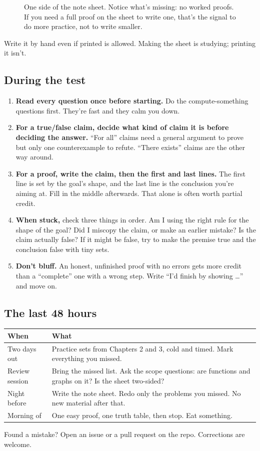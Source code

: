 \begin{figure}[H]
\begin{tikzpicture}[x=1.4cm,y=1.05cm,every node/.style={font=\footnotesize,align=left,anchor=north west}]
\end{tikzpicture}
\caption{One side of the note sheet. Notice what's missing: no worked proofs. If you need a full proof on the sheet to write one, that's the signal to do more practice, not to write smaller.}
\end{figure}

Write it by hand even if printed is allowed. Making the sheet is studying; printing it isn't.

\subsection{During the test}
\begin{enumerate}
\item \textbf{Read every question once before starting.} Do the compute-something questions first. They're fast and they calm you down.
\item \textbf{For a true/false claim, decide what kind of claim it is before deciding the answer.} ``For all'' claims need a general argument to prove but only one counterexample to refute. ``There exists'' claims are the other way around.
\item \textbf{For a proof, write the claim, then the first and last lines.} The first line is set by the goal's shape, and the last line is the conclusion you're aiming at. Fill in the middle afterwards. That alone is often worth partial credit.
\item \textbf{When stuck,} check three things in order. Am I using the right rule for the shape of the goal? Did I miscopy the claim, or make an earlier mistake? Is the claim actually false? If it might be false, try to make the premise true and the conclusion false with tiny sets.
\item \textbf{Don't bluff.} An honest, unfinished proof with no errors gets more credit than a ``complete'' one with a wrong step. Write ``I'd finish by showing \dots'' and move on.
\end{enumerate}

\subsection{The last 48 hours}
\begin{table}[H]\centering\small
\begin{tabularx}{\linewidth}{@{}p{2.6cm}L@{}}
\toprule
\textbf{When} & \textbf{What}\\
\midrule
Two days out & Practice sets from Chapters 2 and 3, cold and timed. Mark everything you missed.\\
Review session & Bring the missed list. Ask the scope questions: are functions and graphs on it? Is the sheet two-sided?\\
Night before & Write the note sheet. Redo only the problems you missed. No new material after that.\\
Morning of & One easy proof, one truth table, then stop. Eat something.\\
\bottomrule
\end{tabularx}
\end{table}

\vfill
\begin{center}\small
Found a mistake? Open an issue or a pull request on the repo. Corrections are welcome.
\end{center}
